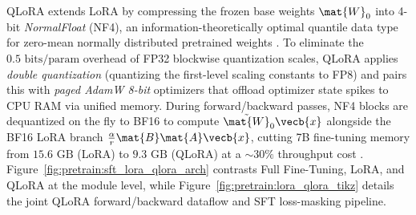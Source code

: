 \documentclass[../../../../master.tex]{subfiles}
\begin{document}
QLoRA extends LoRA by compressing the frozen base weights $\mat{W}_0$ into 4-bit \emph{NormalFloat} (NF4), an information-theoretically optimal quantile data type for zero-mean normally distributed pretrained weights . To eliminate the $0.5\text{ bits/param}$ overhead of FP32 blockwise quantization scales, QLoRA applies \emph{double quantization} (quantizing the first-level scaling constants to FP8) and pairs this with \emph{paged AdamW 8-bit} optimizers that offload optimizer state spikes to CPU RAM via unified memory. During forward/backward passes, NF4 blocks are dequantized on the fly to BF16 to compute $\tilde{\mat{W}}_0\vecb{x}$ alongside the BF16 LoRA branch $\frac{\alpha}{r}\mat{B}\mat{A}\vecb{x}$, cutting 7B fine-tuning memory from $15.6\text{ GB}$ (LoRA) to $9.3\text{ GB}$ (QLoRA) at a $\sim 30\%$ throughput cost . Figure~\ref{fig:pretrain:sft_lora_qlora_arch} contrasts Full Fine-Tuning, LoRA, and QLoRA at the module level, while Figure~\ref{fig:pretrain:lora_qlora_tikz} details the joint QLoRA forward/backward dataflow and SFT loss-masking pipeline.

\end{document}
